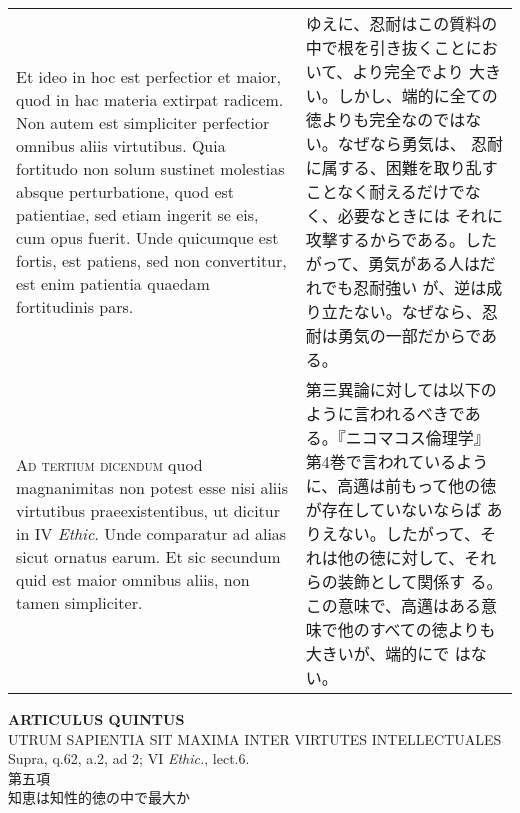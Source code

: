 \documentclass[10pt]{jsarticle}
\begin{document}
\begin{longtable}{p{21em}p{21em}}
Et ideo in hoc est perfectior et maior, quod in hac materia extirpat
radicem. Non autem est simpliciter perfectior omnibus aliis
virtutibus. Quia fortitudo non solum sustinet molestias absque
perturbatione, quod est patientiae, sed etiam ingerit se eis, cum opus
fuerit. Unde quicumque est fortis, est patiens, sed non convertitur,
est enim patientia quaedam fortitudinis pars.


&

 ゆえに、忍耐はこの質料の中で根を引き抜くことにおいて、より完全でより
 大きい。しかし、端的に全ての徳よりも完全なのではない。なぜなら勇気は、
 忍耐に属する、困難を取り乱すことなく耐えるだけでなく、必要なときには
 それに攻撃するからである。したがって、勇気がある人はだれでも忍耐強い
 が、逆は成り立たない。なぜなら、忍耐は勇気の一部だからである。

 
\\



{\scshape Ad tertium dicendum} quod magnanimitas non potest esse nisi
aliis virtutibus praeexistentibus, ut dicitur in IV {\itshape
Ethic}. Unde comparatur ad alias sicut ornatus earum. Et sic secundum
quid est maior omnibus aliis, non tamen simpliciter.


&

第三異論に対しては以下のように言われるべきである。『ニコマコス倫理学』
第4巻で言われているように、高邁は前もって他の徳が存在していないならば
ありえない。したがって、それは他の徳に対して、それらの装飾として関係す
る。この意味で、高邁はある意味で他のすべての徳よりも大きいが、端的にで
はない。



\end{longtable}
\newpage



\begin{center}
{\Large {\bf ARTICULUS QUINTUS}}\\
{\large UTRUM SAPIENTIA SIT MAXIMA INTER VIRTUTES INTELLECTUALES}
{\footnotesize Supra, q.62, a.2, ad 2; VI {\itshape Ethic.}, lect.6.}\\
{\Large 第五項\\知恵は知性的徳の中で最大か}
\end{center}
\end{document}
